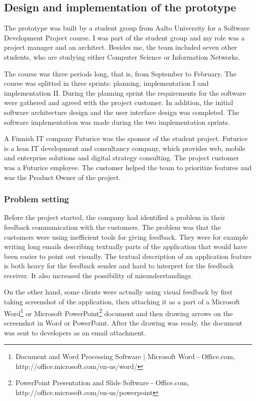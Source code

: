 \documentclass[english,12pt,a4paper,pdftex]{article}
\begin{document}
\subsection{Design and implementation of the prototype}

The prototype was built by a student group from Aalto University for a Software Development Project course. I was part of the student group and my role was a project manager and an architect. Besides me, the team included seven other students, who are studying either Computer Science or Information Networks.

The course was three periods long, that is, from September to February. The course was splitted in three sprints: planning, implementation I and implementation II. During the planning sprint the requirements for the software were gathered and agreed with the project customer. In addition, the initial software architecture design and the user interface design was completed. The software implementation was made during the two implementation sprints.

A Finnish IT company Futurice was the sponsor of the student project. Futurice is a lean IT development and consultancy company, which provides web, mobile and enterprise solutions and digital strategy consulting. The project customer was a Futurice employee. The customer helped the team to prioritize features and was the Product Owner of the project. 

\subsubsection{Problem setting}

Before the project started, the company had identified a problem in their feedback communication with the customers. The problem was that the customers were using inefficient tools for giving feedback. They were for example writing long emails describing textually parts of the application that would have been easier to point out visually. The textual description of an application feature is both heavy for the feedback sender and hard to interpret for the feedback receiver. It also increased the possibility of misunderstandings.

On the other hand, some clients were actually using visual feedback by first taking screenshot of the application, then attaching it as a part of a Microsoft Word\footnote{Document and Word Processing Software | Microsoft Word - Office.com, http://office.microsoft.com/en-us/word/} or Microsoft PowerPoint\footnote{PowerPoint Presentation and Slide Software - Office.com, http://office.microsoft.com/en-us/powerpoint} document and then drawing arrows on the screenshot in Word or PowerPoint. After the drawing was ready, the document was sent to developers as an email attachment. 
\end{document}
